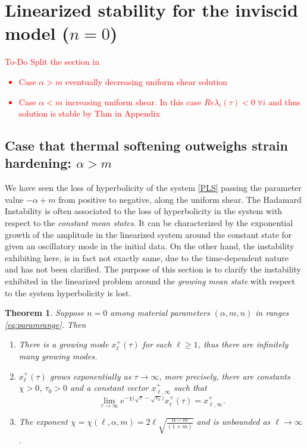 \documentclass[a4paper,11pt]{article}
\def\l{{\ell}}
\newcommand{\tcr}{\textcolor{red}}
\newtheorem{theorem}{Theorem}
\theoremstyle{remark}
\begin{document}
%


\section{Linearized stability for the inviscid model ($n=0$)} \label{sec:Hadamard}

\tcr{To-Do  Split the section in 
\begin{itemize}
\item Case $\alpha > m$ eventually decreasing uniform shear solution
\item Case $\alpha < m$ increasing uniform shear.
In this case $Re \lambda_i (\tau ) < 0 \; \forall i$ and thus solution is stable by Thm in Appendix
\end{itemize}
}


\subsection{Case that thermal softening outweighs strain hardening: $\alpha > m$}
We have seen the loss of hyperbolicity of the system \eqref{PLS} passing the parameter value $-\alpha+m$ from positive to negative, along the uniform shear. The Hadamard Instability is often associated to the loss of hyperbolicity in the system with respect to the {\it constant mean states}. It can be characterized by the exponential growth of the amplitude in the linearized system around the constant state for given an oscillatory mode in the initial data. On the other hand, the instability exhibiting here, is in fact not exactly same, due to the time-dependent nature and has not been clarified. The purpose of this section is to clarify the instability exhibited in the linearized problem around the {\it growing mean state} with respect to the system hyperbolicity is lost.

\begin{theorem} \label{thm:Hadamard} Suppose $n=0$ among material parameters $(\alpha,m,n)$ in ranges \eqref{eq:paramrange}. Then
  \begin{enumerate}
    \item There is a growing mode $x_\ell^+(\tau)$ for each $\ell\ge1$, thus there are infinitely many growing modes.
    \item $x_\ell^+(\tau)$ grows exponentially as $\tau \rightarrow \infty$, more precisely, there are constants $\chi>0$, $\tau_0>0$ and a constant vector $x_{\ell,\infty}^+$ such that
    \begin{equation}
      \lim_{\tau \rightarrow \infty} e^{-\chi \big(\sqrt{\tau}-\sqrt{\tau_0}\big)} x_\ell^+(\tau) = x_{\ell,\infty}^+.
    \end{equation}
    \item The exponent $\chi=\chi(\ell,\alpha,m)=2\l\sqrt{\frac{\alpha-m}{(1+m)}}$ and is unbounded as $\ell \rightarrow \infty$.
  \end{enumerate}
\end{theorem}
\end{document}
